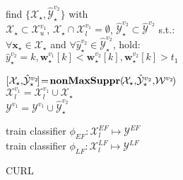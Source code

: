 \documentclass[journal,11pt]{IEEEtran}
\begin{document}
\begin{algorithm}[!tbp]
{{{{				find $\{\mathcal{X}_\star,\hat{\mathcal{Y}}_\star^{v_2} \}$ with \\
				$\mathcal{X}_\star \! \subset \! \mathcal{X}_u^{v_1}$, $\mathcal{X}_\star \! \cap \! \mathcal{X}_l^{v_1} \! = \! \emptyset$, $\hat{\mathcal{Y}}_\star^{v_2} \subset \hat{\mathcal{Y}}^{v_2}$ s.t.: \\
				$\forall \mathbf{x}_\star \! \in \! \mathcal{X}_\star$ and $\forall \hat{y}_\star^{v_2} \! \in \! \hat{\mathcal{Y}}_\star^{v_2}$, hold: \\
				$\hat{y}_\star^{v_2}=k, \mathbf{w}_\star^{v_1}[k]<\mathbf{w}_\star^{v_2}[k], \mathbf{w}_\star^{v_2}[k]  > \! t_1$\\

				$[\mathcal{X}_\star,\! \hat{\mathcal{Y}}_\star^{v_2} \!] \! = \! \text{\bf{nonMaxSuppr}}(\! \mathcal{X}_\star ,\! \hat{\mathcal{Y}}_\star^{v_2} ,\! \mathcal{W}^{v_2} \! )$ \\
				$\mathcal{X}_l^{v_1}=\mathcal{X}_l^{v_1} \cup {\mathcal{X}}_\star$ \\
				$\mathcal{Y}^{v_1}=\mathcal{Y}^{v_1} \cup \hat{\mathcal{Y}}_\star^{v_2}$ \\

						}

				}


			train classifier $\phi_{\scriptscriptstyle EF}: \mathcal{X}_l^{\scriptscriptstyle EF} \mapsto {\mathcal{Y}}^{\scriptscriptstyle EF}$\\
			train classifier $\phi_{\scriptscriptstyle LF}: \mathcal{X}_l^{\scriptscriptstyle LF} \mapsto {\mathcal{Y}}^{\scriptscriptstyle LF}$\\
		}

} %
\label{alg:curl}
\caption{CURL}
\end{algorithm}
\end{document}
